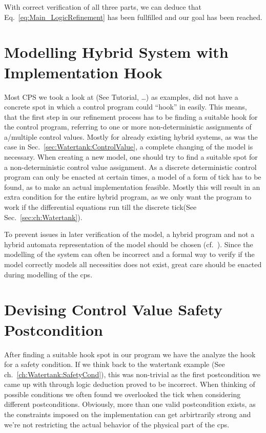 With correct verification of all three parts, we can deduce that Eq.~\ref{eq:Main_LogicRefinement} has been fullfilled and our goal has been reached.

\section{Modelling Hybrid System with Implementation Hook}
\label{sec:Process:Hook}
Most CPS we took a look at (See \cite{keymaera} Tutorial, \cite[p.~5, p.~11]{platzer2010b} \dots) as examples, did not have a concrete spot in which a control program could ``hook'' in easily. This means, that the first step in our refinement process has to be finding a suitable hook for the control program, referring to one or more non-deterministic assignments of a/multiple control values. Mostly for already existing hybrid systems, as was the case in Sec.~\ref{sec:Watertank:ControlValue}, a complete changing of the model is necessary. When creating a new model, one should try to find a suitable spot for a non-deterministic control value assignment. As a discrete deterministic control program can only be enacted at certain times, a model of a form of tick has to be found, as to make an actual implementation feasible. Mostly this will result in an extra condition for the entire hybrid program, as we only want the program to work if the differential equations run till the discrete tick(See Sec.~\ref{sec:ch:Watertank}).

To prevent issues in later verification of the model, a hybrid program and not a hybrid automata representation of the model should be chosen (cf.~\cite[ch.~1.1.4]{platzer2010b}). Since the modelling of the system can often be incorrect and a formal way to verify if the model correctly models all necessities does not exist, great care should be enacted during modelling of the cps.

\section{Devising Control Value Safety Postcondition}
\label{sec:Process:SafetyCond}

After finding a suitable hook spot in our program we have the analyze the hook for a safety condition. If we think back to the watertank example (See ch.~\ref{ch:Watertank:SafetyCond}), this was non-trivial as the first postcondition we came up with through logic deduction proved to be incorrect. When thinking of possible conditions we often found we overlooked the tick when considering different postconditions. Obviously, more than one valid postcondition exists, as the constraints imposed on the implementation can get arbirtrarily strong and we're not restricting the actual behavior of the physical part of the cps. 

